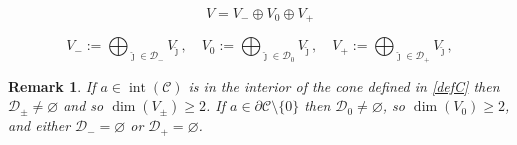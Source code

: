\documentclass[10pt,a4paper]{amsart}
\newtheorem{remark}{Remark}
\newcommand{\cC}{{\mathcal C}}
\newcommand{\cD}{{\mathcal D}}
\renewcommand{\emptyset}{\varnothing}
\DeclareMathOperator{\interior}{int}
\begin{document}
\begin{equation}\label{eq:def V-0+}
    V = V_- \oplus V_0 \oplus V_+   
 \end{equation}   

\begin{equation}\label{eq:def cD-0+}
V_-:=\bigoplus_{\hat \jmath \in \cD_- }V_{\hat \jmath}\, , \quad  V_0:=\bigoplus_{\hat \jmath \in \cD_0} V_{\hat \jmath} \, , \quad  V_+:=\bigoplus_{\hat \jmath \in \cD_+ }V_{\hat \jmath}  \, , \end{equation}

\begin{remark}\label{lem:linese}
If $a\in \interior(\cC)$  is in the interior of
the  cone  defined   in \eqref{defC} 
  then  
  $\cD_\pm \not=\emptyset$ and so 
  $\dim(V_\pm ) \geq 2$.
%    
If 
$a \in \partial \cC\setminus\{0\} $ 
 then 
  $\cD_0 \not =\emptyset $, so  
$\dim(V_0)\geq 2 $, and   
either $\cD_- =\emptyset$ or $\cD_+ =\emptyset$.   
\end{remark}
\end{document}

